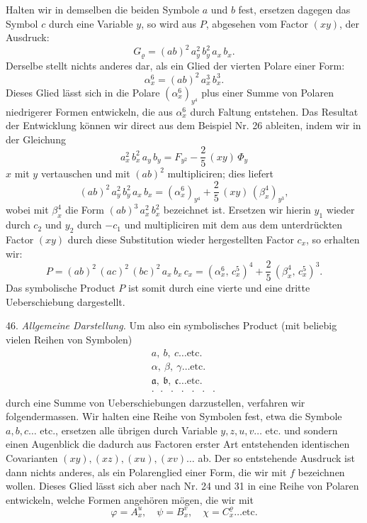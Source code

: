 Halten wir in demselben die beiden Symbole $a$ und $b$ fest, ersetzen dagegen das Symbol $c$ durch eine Variable $y$, so wird aus $P$, abgesehen vom Factor $(xy)$, der Ausdruck:
\[
G_\varrho = (ab)^2\,a_y^2\,b_y^2\,a_x\,b_x.
\]
Derselbe stellt nichts anderes dar, als ein Glied der vierten Polare einer Form:
\[
\alpha_x^6 = (ab)^2\,a_x^3\,b_x^3.
\]
Dieses Glied lässt sich in die Polare $(\alpha_x^6)_{y^4}$ plus einer Summe von Polaren niedrigerer Formen entwickeln, die aus $\alpha_x^6$ durch Faltung entstehen. Das Resultat der Entwicklung können wir direct aus dem Beispiel Nr. 26 ableiten, indem wir in der Gleichung
\[
a_x^2\,b_x^2\,a_y\,b_y = F_{y^2} - \frac{2}{5}\,(xy)\,\Phi_y
\]
$x$ mit $y$ vertauschen und mit $(ab)^2$ multipliciren; dies liefert
\[
(ab)^2\,a_y^2\,b_y^2\,a_x\,b_x = (\alpha_x^6)_{y^4} + \frac{2}{5}\,(xy)\,(\beta_x^4)_{y^3},
\]
wobei mit $\beta_x^4$ die Form $(ab)^3\,a_x^2\,b_x^2$ bezeichnet ist. Ersetzen wir hierin $y_1$ wieder durch $c_2$ und $y_2$ durch $-c_1$ und multipliciren mit dem aus dem unterdrückten Factor $(xy)$ durch diese Substitution wieder hergestellten Factor $c_x$, so erhalten wir:
\[
P = (ab)^2\,(ac)^2\,(bc)^2\,a_x\,b_x\,c_x = (\alpha_x^6,\, c_x^5)^4 + \frac{2}{5}\,(\beta_x^4,\, c_x^5)^3.
\]
Das symbolische Product $P$ ist somit durch eine vierte und eine dritte Ueberschiebung dargestellt.

46. \textit{Allgemeine Darstellung.} Um also ein symbolisches Product (mit beliebig vielen Reihen von Symbolen)
\[
\begin{array}{c}
a,\ b,\ c \dots \text{etc.} \\
\alpha,\ \beta,\ \gamma \dots \text{etc.} \\
\mathfrak{a},\ \mathfrak{b},\ \mathfrak{c} \dots \text{etc.} \\
\cdot\ \ \cdot\ \ \cdot\ \ \cdot\ \ \cdot\ \ \cdot\ \ \cdot
\end{array}
\]
durch eine Summe von Ueberschiebungen darzustellen, verfahren wir folgendermassen. Wir halten eine Reihe von Symbolen fest, etwa die Symbole $a, b, c \dots$ etc., ersetzen alle übrigen durch Variable $y, z, u, v \dots$ etc. und sondern einen Augenblick die dadurch aus Factoren erster Art entstehenden identischen Covarianten $(xy), (xz), (xu), (xv) \dots$ ab. Der so entstehende Ausdruck ist dann nichts anderes, als ein Polarenglied einer Form, die wir mit $f$ bezeichnen wollen. Dieses Glied lässt sich aber nach Nr. 24 und 31 in eine Reihe von Polaren entwickeln, welche Formen angehören mögen, die wir mit
\[
\varphi = A_x^u, \quad \psi = B_x^v, \quad \chi = C_x^\varrho \dots \text{etc.}
\]


